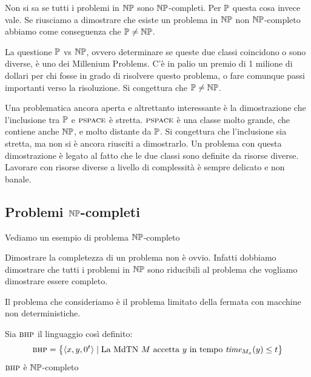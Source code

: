 Non si sa se tutti i problemi in $\mathbb{NP}$ sono $\mathbb{NP}$-completi. Per $\mathbb{P}$ questa cosa
invece vale.  Se riusciamo a dimostrare che esiste un problema in $\mathbb{NP}$ non $\mathbb{NP}$-completo
abbiamo come conseguenza che
$\mathbb{P} \not= \mathbb{NP}$.


La questione $\mathbb{P}$ vs $\mathbb{NP}$, ovvero determinare se queste due classi coincidono o sono
diverse, è uno dei Millenium Problems. C'è in palio un premio di 1 milione di dollari per chi
fosse in grado di risolvere questo problema, o fare comunque passi importanti verso la risoluzione.
Si congettura che $\mathbb{P} \not= \mathbb{NP}$.

Una problematica ancora aperta e altrettanto interessante è la dimostrazione che l'inclusione tra
$\mathbb{P}$ e $\textsc{pspace}$ è stretta. $\textsc{pspace}$ è una classe molto grande, che contiene anche
$\mathbb{NP}$, e molto distante da $\mathbb{P}$. Si congettura che l'inclusione sia stretta, ma non si è
ancora riusciti a dimostrarlo. Un problema con questa dimostrazione è legato al fatto che le due
classi sono definite da risorse diverse. Lavorare con risorse diverse a livello di complessità è
sempre delicato e non banale.


\subsection{Problemi $\mathbb{NP}$-completi}

Vediamo un esempio di problema $\mathbb{NP}$-completo

Dimostrare la completezza di un problema non è ovvio. Infatti dobbiamo dimostrare che tutti i
problemi in $\mathbb{NP}$ sono riducibili al problema che vogliamo dimostrare essere completo.

Il problema che consideriamo è il problema limitato della fermata con macchine non deterministiche.

\begin{thm}
    Sia $\textsc{bhp}$ il linguaggio così definito:
    \begin{equation*}
        \textsc{bhp} = \left\{\langle x,y,0^{t} \rangle \mid \text{La MdTN $M$ accetta $y$ in tempo
        $\textit{time}_{M_{x}}(y) \leq t$}\right\}
    \end{equation*}
    $\textsc{bhp}$ è $\mathbb{NP}$-completo
\end{thm}


